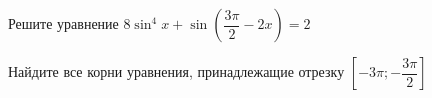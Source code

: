 \begin{ex}
	\begin{condition}
		\begin{enumcols}[label=\asbuk*)]
			\item Решите уравнение \( 8\sin^4 x + \sin{\left(\dfrac{3\pi}{2}-2x\right)}= 2 \)
			\item Найдите все корни уравнения, принадлежащие отрезку \( \left[-3\pi;-\dfrac{3\pi}{2}\right] \)
		\end{enumcols}
	\end{condition}
\end{ex}